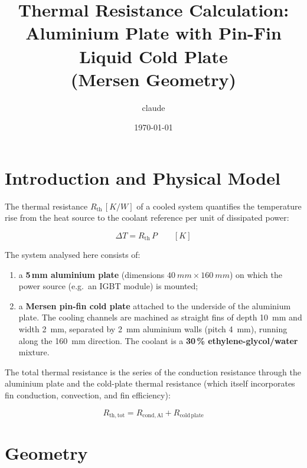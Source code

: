 \documentclass[a4paper,11pt]{article}
\title{\textbf{Thermal Resistance Calculation:\\
Aluminium Plate with Pin-Fin Liquid Cold Plate\\
(Mersen Geometry)}}
\author{claude}
\date{\today}
\begin{document}
\maketitle
\tableofcontents
\bigskip

\section{Introduction and Physical Model}

The thermal resistance $R_{\mathrm{th}}\,[\si{K/W}]$ of a cooled system quantifies
the temperature rise from the heat source to the coolant reference per unit of
dissipated power:

\begin{equation}
  \Delta T = R_{\mathrm{th}}\, P
  \qquad\left[\si{K}\right]
\end{equation}

The system analysed here consists of:
\begin{enumerate}
  \item a \textbf{5\,mm aluminium plate} (dimensions $\SI{40}{mm}\times\SI{160}{mm}$)
        on which the power source (e.g.\ an IGBT module) is mounted;
  \item a \textbf{Mersen pin-fin cold plate} attached to the underside of the
        aluminium plate. The cooling channels are machined as straight fins of
        depth \SI{10}{mm} and width \SI{2}{mm}, separated by \SI{2}{mm} aluminium
        walls (pitch \SI{4}{mm}), running along the \SI{160}{mm} direction.
        The coolant is a \textbf{30\,\% ethylene-glycol/water} mixture.
\end{enumerate}

The total thermal resistance is the series of the conduction resistance through the
aluminium plate and the cold-plate thermal resistance (which itself incorporates fin
conduction, convection, and fin efficiency):

\begin{equation}
  \boxed{R_{\mathrm{th,tot}} = R_{\mathrm{cond,Al}} + R_{\mathrm{cold\,plate}}}
\end{equation}

\section{Geometry}
\end{document}
